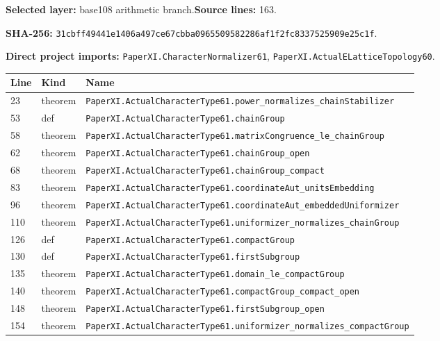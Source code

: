 \documentclass[10pt,oneside]{book}
\begin{document}
\textbf{Selected layer:} base108 arithmetic branch.\quad\textbf{Source lines:} 163.\par\textbf{SHA-256:} {\scriptsize\nolinkurl{31cbff49441e1406a497ce67cbba0965509582286af1f2fc8337525909e25c1f}}.


\textbf{Direct project imports:} \nolinkurl{PaperXI.CharacterNormalizer61}, \nolinkurl{PaperXI.ActualELatticeTopology60}.

\begin{longtable}{@{}p{}p{}p{}@{}}\toprule Line&Kind&Name\\\midrule\endhead

23&theorem&\nolinkurl{PaperXI.ActualCharacterType61.power_normalizes_chainStabilizer}\\

53&def&\nolinkurl{PaperXI.ActualCharacterType61.chainGroup}\\

58&theorem&\nolinkurl{PaperXI.ActualCharacterType61.matrixCongruence_le_chainGroup}\\

62&theorem&\nolinkurl{PaperXI.ActualCharacterType61.chainGroup_open}\\

68&theorem&\nolinkurl{PaperXI.ActualCharacterType61.chainGroup_compact}\\

83&theorem&\nolinkurl{PaperXI.ActualCharacterType61.coordinateAut_unitsEmbedding}\\

96&theorem&\nolinkurl{PaperXI.ActualCharacterType61.coordinateAut_embeddedUniformizer}\\

110&theorem&\nolinkurl{PaperXI.ActualCharacterType61.uniformizer_normalizes_chainGroup}\\

126&def&\nolinkurl{PaperXI.ActualCharacterType61.compactGroup}\\

130&def&\nolinkurl{PaperXI.ActualCharacterType61.firstSubgroup}\\

135&theorem&\nolinkurl{PaperXI.ActualCharacterType61.domain_le_compactGroup}\\

140&theorem&\nolinkurl{PaperXI.ActualCharacterType61.compactGroup_compact_open}\\

148&theorem&\nolinkurl{PaperXI.ActualCharacterType61.firstSubgroup_open}\\

154&theorem&\nolinkurl{PaperXI.ActualCharacterType61.uniformizer_normalizes_compactGroup}\\

\bottomrule\end{longtable}
\end{document}
